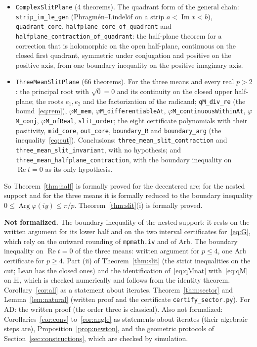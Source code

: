 \documentclass[10pt,a4paper]{article}
\theoremstyle{plain}
\theoremstyle{remark}
\numberwithin{equation}{section}
\DeclareMathOperator{\re}{Re}\DeclareMathOperator{\im}{Im}
\DeclareMathOperator{\Arg}{Arg}\DeclareMathOperator{\Log}{Log}
\newcommand{\lean}[1]{\texttt{#1}}
\begin{document}
\begin{itemize}
\item \lean{ComplexSlitPlane} (4 theorems). The quadrant form of the general chain:
  \lean{strip\_im\_le\_gen} (Phragm\'en--Lindel\"of on a strip $a<\im x<b$), \lean{quadrant\_core},
  \lean{halfplane\_core\_of\_quadrant} and \lean{halfplane\_contraction\_of\_quadrant}: the
  half-plane theorem for a correction that is holomorphic on the open half-plane, continuous on the
  closed first quadrant, symmetric under conjugation and positive on the positive axis, from one
  boundary inequality on the positive imaginary axis.
\item \lean{ThreeMeanSlitPlane} (66 theorems). For the three means and every real $p>2$: the
  principal root with $\sqrt0=0$ and its continuity on the closed upper half-plane; the roots
  $e_1,e_2$ and the factorization of the radicand; \lean{qM\_div\_re} (the bound~\eqref{eq:rem}),
  \lean{$\varphi$M\_mem}, \lean{$\varphi$M\_differentiableAt},
  \lean{$\varphi$M\_continuousWithinAt}, \lean{$\varphi$M\_conj}, \lean{$\varphi$M\_ofReal},
  \lean{slit\_order}; the eight certificate polynomials with their positivity, \lean{mid\_core},
  \lean{out\_core}, \lean{boundary\_R} and \lean{boundary\_arg} (the inequality~\eqref{eq:cut}).
  Conclusions: \lean{three\_mean\_slit\_contraction} and \lean{three\_mean\_slit\_invariant}, with
  no hypothesis; and \lean{three\_mean\_halfplane\_contraction}, with the boundary inequality on
  $\re t=0$ as its only hypothesis.
\end{itemize}
So Theorem~\ref{thm:half} is formally proved for the decentered arc; for the nested support and for
the three means it is formally reduced to the boundary inequality $0\le\Arg\varphi(iy)\le\pi/p$.
Theorem~\ref{thm:slit}(i) is formally proved.

\textbf{Not formalized.} The boundary inequality of the nested support: it rests on the written
argument for its lower half and on the two interval certificates for~\eqref{eq:G}, which rely on
the outward rounding of \texttt{mpmath.iv} and of Arb. The boundary inequality on $\re t=0$ of the
three means: written argument for $p\le4$, one Arb certificate for $p\ge4$. Part (ii) of
Theorem~\ref{thm:slit} (the strict inequalities on the cut; Lean has the closed ones) and the
identification of~\eqref{eq:qMnat} with~\eqref{eq:qM} on $\mathbb{H}$, which is checked numerically and
follows from the identity theorem. Corollary~\ref{cor:all} as a statement about iterates.
Theorem~\ref{thm:sector} and
Lemma~\ref{lem:natural} (written proof and the certificate \texttt{certify\_sector.py}). For AD: the
written proof (the order three is classical). Also not formalized: Corollaries~\ref{cor:conv}
to~\ref{cor:angle} as statements about iterates (their algebraic steps are),
Proposition~\ref{prop:newton}, and the geometric protocols of Section~\ref{sec:constructions},
which are checked by simulation.
\end{document}

